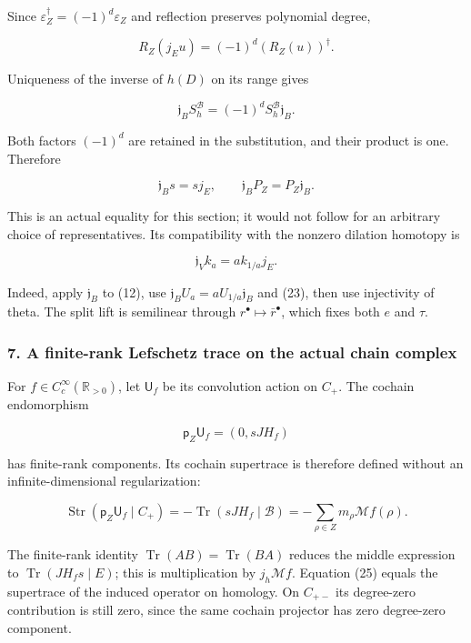 Since \(\varepsilon_Z^\dagger=(-1)^d\varepsilon_Z\) and reflection preserves polynomial degree,

\[R_Z(j_Eu)=(-1)^d(R_Z(u))^\dagger.\]

Uniqueness of the inverse of \(h(D)\) on its range gives

\[\mathfrak j_B S_h^{\mathscr B}=(-1)^d S_h^{\mathscr B}\mathfrak j_B.\]

Both factors \((-1)^d\) are retained in the substitution, and their product is one. Therefore

\[\boxed{\mathfrak j_Bs=sj_E,\qquad
\mathfrak j_BP_Z=P_Z\mathfrak j_B.}\tag{23}\]

This is an actual equality for this section; it would not follow for an arbitrary choice of
representatives. Its compatibility with the nonzero dilation homotopy is

\[\boxed{\mathfrak j_V k_a=a k_{1/a}j_E.}\tag{24}\]

Indeed, apply \(\mathfrak j_B\) to (12), use \(\mathfrak j_BU_a=aU_{1/a}\mathfrak j_B\) and (23),
then use injectivity of theta. The split lift is semilinear through
\(r^\bullet\mapsto\bar r^\bullet\), which fixes both \(e\) and \(\tau\).

\subsubsection{7. A finite-rank Lefschetz trace on the actual chain
complex}\label{pr_9:a-finite-rank-lefschetz-trace-on-the-actual-chain-complex}

For \(f\in C_c^\infty(\mathbb R_{>0})\), let \(\mathsf U_f\) be its convolution action on \(C_+\).
The cochain endomorphism

\[\mathsf p_Z\mathsf U_f=(0,sJH_f)\]

has finite-rank components. Its cochain supertrace is therefore defined without an
infinite-dimensional regularization:

\[\boxed{\operatorname{Str}(\mathsf p_Z\mathsf U_f\mid C_+)
=-\operatorname{Tr}(sJH_f\mid\mathscr B)
=-\sum_{\rho\in Z}m_\rho\mathcal Mf(\rho).}\tag{25}\]

The finite-rank identity \(\operatorname{Tr}(AB)=\operatorname{Tr}(BA)\) reduces the middle
expression to \(\operatorname{Tr}(JH_fs\mid E)\); this is multiplication by \(j_h\mathcal Mf\).
Equation (25) equals the supertrace of the induced operator on homology. On \(C_{+-}\) its
degree-zero contribution is still zero, since the same cochain projector has zero degree-zero
component.

